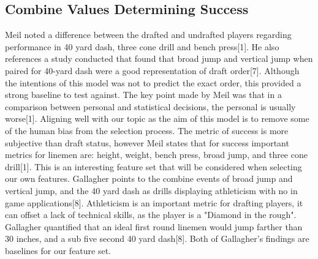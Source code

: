 \documentclass[confrence]{IEEEtran}
\begin{document}
\subsection*{Combine Values Determining Success}
Meil noted a difference between the drafted and undrafted players regarding performance in 40 yard dash, three cone drill and bench press[1].
He also references a study conducted that found that broad jump and vertical jump when paired for 40-yard dash were a good representation of draft order[7].
Although the intentions of this model was not to predict the exact order, this provided a strong baseline to test against.
The key point made by Meil was that in a comparison between personal and statistical decisions, the personal is usually worse[1].
Aligning well with our topic as the aim of this model is to remove some of the human bias from the selection process.
The metric of success is more subjective than draft status, however Meil states that for success important metrics for linemen are: height, weight, bench press, broad jump, and three cone drill[1].
This is an interesting feature set that will be considered when selecting our own features.
Gallagher points to the combine events of broad jump and vertical jump, and the 40 yard dash as drills displaying athleticism with no in game applications[8].
Athleticism is an important metric for drafting players, it can offset a lack of technical skills, as the player is a "Diamond in the rough".
Gallagher quantified that an ideal first round linemen would jump farther than 30 inches, and a sub five second 40 yard dash[8].
Both of Gallagher's findings are baselines for our feature set.
\end{document}

